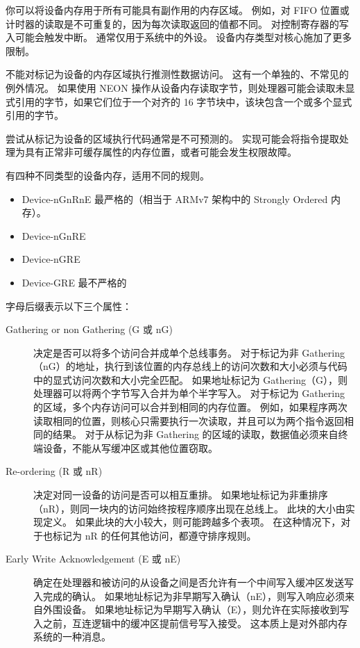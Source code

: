 
你可以将设备内存用于所有可能具有副作用的内存区域。
例如，对 FIFO 位置或计时器的读取是不可重复的，因为每次读取返回的值都不同。
对控制寄存器的写入可能会触发中断。
通常仅用于系统中的外设。
设备内存类型对核心施加了更多限制。

不能对标记为设备的内存区域执行推测性数据访问。
这有一个单独的、不常见的例外情况。
如果使用 NEON 操作从设备内存读取字节，则处理器可能会读取未显式引用的字节，如果它们位于一个对齐的 16 字节块中，该块包含一个或多个显式引用的字节。

尝试从标记为设备的区域执行代码通常是不可预测的。
实现可能会将指令提取处理为具有正常非可缓存属性的内存位置，或者可能会发生权限故障。

有四种不同类型的设备内存，适用不同的规则。

\begin{itemize}
\item
  Device-nGnRnE 最严格的（相当于 ARMv7 架构中的 Strongly Ordered 内存）。
\item
  Device-nGnRE
\item
  Device-nGRE
\item
  Device-GRE 最不严格的
\end{itemize}

字母后缀表示以下三个属性：

\begin{description}
  \item [Gathering or non Gathering (G 或 nG)]

  决定是否可以将多个访问合并成单个总线事务。
  对于标记为非 Gathering（nG）的地址，执行到该位置的内存总线上的访问次数和大小必须与代码中的显式访问次数和大小完全匹配。
  如果地址标记为 Gathering（G），则处理器可以将两个字节写入合并为单个半字写入。
  对于标记为 Gathering 的区域，多个内存访问可以合并到相同的内存位置。
  例如，如果程序两次读取相同的位置，则核心只需要执行一次读取，并且可以为两个指令返回相同的结果。
  对于从标记为非 Gathering 的区域的读取，数据值必须来自终端设备，不能从写缓冲区或其他位置窃取。

  \item [Re-ordering (R 或 nR)]

  决定对同一设备的访问是否可以相互重排。
  如果地址标记为非重排序（nR），则同一块内的访问始终按程序顺序出现在总线上。
  此块的大小由实现定义。
  如果此块的大小较大，则可能跨越多个表项。
  在这种情况下，对于也标记为
  nR 的任何其他访问，都遵守排序规则。

  \item [Early Write Acknowledgement (E 或 nE)]

  确定在处理器和被访问的从设备之间是否允许有一个中间写入缓冲区发送写入完成的确认。
  如果地址标记为非早期写入确认（nE），则写入响应必须来自外围设备。
  如果地址标记为早期写入确认（E），则允许在实际接收到写入之前，互连逻辑中的缓冲区提前信号写入接受。
  这本质上是对外部内存系统的一种消息。

\end{description}


